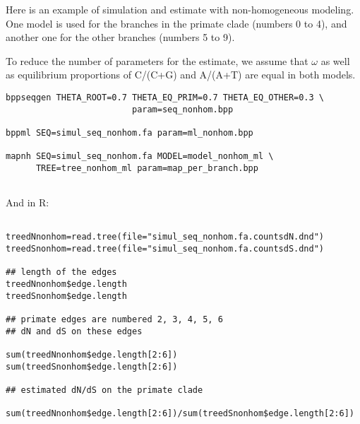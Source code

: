 \documentclass[11pt, a4paper]{article}
\begin{document}
Here is an example of simulation and estimate with non-homogeneous
modeling. One model is used for the branches in the primate clade
(numbers 0 to 4), and another one for the other branches (numbers 5 to
9).

To reduce the number of parameters for the estimate, we assume that
$\omega$ as well as equilibrium proportions of C/(C+G) and A/(A+T) are
equal in both models.

\begin{verbatim}
bppseqgen THETA_ROOT=0.7 THETA_EQ_PRIM=0.7 THETA_EQ_OTHER=0.3 \
                         param=seq_nonhom.bpp

bppml SEQ=simul_seq_nonhom.fa param=ml_nonhom.bpp

mapnh SEQ=simul_seq_nonhom.fa MODEL=model_nonhom_ml \
      TREE=tree_nonhom_ml param=map_per_branch.bpp
 
\end{verbatim}

And in R:

\begin{verbatim}

treedNnonhom=read.tree(file="simul_seq_nonhom.fa.countsdN.dnd")  
treedSnonhom=read.tree(file="simul_seq_nonhom.fa.countsdS.dnd")  

## length of the edges 
treedNnonhom$edge.length
treedSnonhom$edge.length

## primate edges are numbered 2, 3, 4, 5, 6
## dN and dS on these edges

sum(treedNnonhom$edge.length[2:6])
sum(treedSnonhom$edge.length[2:6])

## estimated dN/dS on the primate clade

sum(treedNnonhom$edge.length[2:6])/sum(treedSnonhom$edge.length[2:6])

\end{verbatim}
\end{document}
